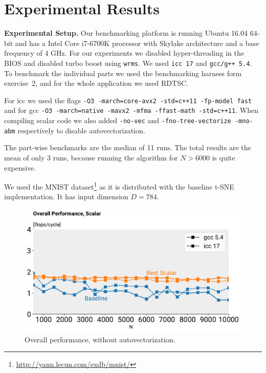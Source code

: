 \documentclass[letterpaper]{article}
\newcommand{\mypar}[1]{{\bf #1.}}
\begin{document}
\section{Experimental Results}\label{sec:exp}

\mypar{Experimental Setup}
Our benchmarking platform is running Ubuntu 16.04 64-bit and has a Intel Core i7-6700K processor with Skylake architecture and a base frequency of 4 GHz. For our experiments we disabled hyper-threading in the BIOS and disabled turbo boost using \texttt{wrms}. We used \texttt{icc 17} and \texttt{gcc/g++ 5.4}. To benchmark the individual parts we used the benchmarking harness form exercise~2, and for the whole application we used RDTSC.

\begin{sloppypar}
For icc we used the flags \texttt{-O3 -march=core-avx2 -std=c++11 -fp-model fast} and for gcc \texttt{-O3 -march=native -mavx2 -mfma -ffast-math -std=c++11}. When compiling scalar code we also added \texttt{-no-vec} and \texttt{-fno-tree-vectorize -mno-abm} respectively to disable autovectorization.
\end{sloppypar}

The part-wise benchmarks are the median of 11 runs. The total results are the mean of only 3 runs, because running the algorithm for $N > 6000$ is quite expensive.

We used the MNIST dataset\footnote{\url{http://yann.lecun.com/exdb/mnist/}} as it is distributed with the baseline t-SNE implementation. It has input dimension $D=784$.

\begin{figure}[h]
  \includegraphics[width=\linewidth]{images/overall_novec}
  \caption{Overall performance, without autovectorization.}
   \label{fig:overall:novec}
      \vspace{-2mm}
\end{figure}
\end{document}
